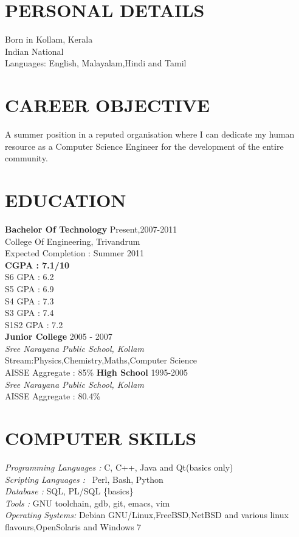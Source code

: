 \begin{resume}
  \section{\textsc{PERSONAL DETAILS}}
  Born in Kollam, Kerala \\
  Indian National\\
  Languages: English, Malayalam,Hindi and Tamil
\newline
\section{\textsc{CAREER OBJECTIVE}} {
  A summer position in a reputed organisation where I can dedicate my human resource as a  Computer Science Engineer for the development of the entire community.
}


\section{\textsc{EDUCATION}} {
  \textbf{Bachelor Of Technology } \hfill  Present,2007-2011 \\
  College Of Engineering, Trivandrum \\
  Expected Completion : Summer 2011\\
  {\bf CGPA    	: 7.1/10}\\
  S6 GPA        : 6.2\\
  S5 GPA        : 6.9\\
  S4 GPA	: 7.3\\
  S3 GPA 	: 7.4\\
  S1S2 GPA	: 7.2\\
  \newline
  \textbf{Junior College} \hfill 2005 - 2007 \\
         {\it Sree Narayana Public School, Kollam}\\
         Stream:Physics,Chemistry,Maths,Computer Science\\
         AISSE Aggregate : 85\%
         \newline
         \textbf{High School} \hfill 1995-2005\\
                {\it Sree Narayana Public School, Kollam}\\
                AISSE Aggregate : 80.4\%
}


\section{\textsc{COMPUTER SKILLS}}{
  {\it Programming Languages : }C, C++, Java and Qt(basics only)\\
  {\it Scripting Languages : }\LaTeXe\, Perl, Bash, Python \\
  {\it Database : }SQL, PL/SQL \{basics\}\\
  {\it Tools : }GNU toolchain, gdb, git, emacs, vim\\
  {\it Operating Systems: } Debian GNU/Linux,FreeBSD,NetBSD and various linux flavours,OpenSolaris and Windows 7
}



\end{resume}

